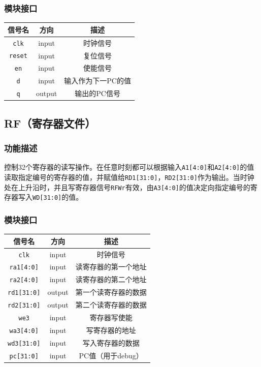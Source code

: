 \documentclass[UTF8,a4paper,autofakebold,15pt]{ctexart}
\begin{document}
\subsubsection{模块接口}
\begin{center}
	
	
	\begin{tabular}{|c|c|c|}
		\hline
		信号名&方向&描述\\
		\hline
		{\tt clk}&input&时钟信号\\
		\hline
		{\tt reset}&input&复位信号\\
		\hline
		{\tt en}&input&使能信号\\
		\hline
		{\tt d}&input&输入作为下一PC的值\\
		\hline
		{\tt q}&output&输出的PC信号\\
		\hline
	\end{tabular}

	
\end{center}

\subsection{RF（寄存器文件）}

\subsubsection{功能描述}

控制32个寄存器的读写操作。在任意时刻都可以根据输入{\tt A1[4:0]}和{\tt A2[4:0]}的值读取指定编号的寄存器的值，并赋值给{\tt RD1[31:0]}，{\tt RD2[31:0]}作为输出。当时钟处在上升沿时，并且写寄存器信号{\tt RFWr}有效，由{\tt A3[4:0]}的值决定向指定编号的寄存器写入{\tt WD[31:0]}的值。

\subsubsection{模块接口}

\begin{center}
	\begin{tabular}{|c|c|c|}
		\hline
		信号名&方向&描述\\
		\hline
		{\tt clk}&input&时钟信号\\
		\hline
		{\tt ra1[4:0]}&input&读寄存器的第一个地址\\
		\hline
		{\tt ra2[4:0]}&input&读寄存器的第二个地址\\
		\hline
		{\tt rd1[31:0]}&output&第一个读寄存器的数据\\
		\hline
		{\tt rd2[31:0]}&output&第二个读寄存器的数据\\
		\hline
		{\tt we3}&input&寄存器写使能\\
		\hline
		{\tt wa3[4:0]}&input&写寄存器的地址\\
		\hline
		{\tt wd3[31:0]}&input&写入寄存器的数据\\
		\hline
		{\tt pc[31:0]}&input&PC值（用于debug）\\
		\hline
	\end{tabular}
	
\end{center}
\end{document}
